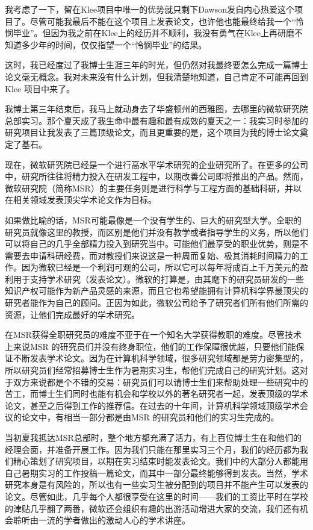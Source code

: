 \documentclass[letter,12pt]{book}
\begin{document}
\begin{CJK}{UTF8}{gbsn}
我考虑了一下，留在Klee项目中唯一的优势就只剩下Dawson发自内心热爱这个项目了。尽管可能我最后不能在这个项目上发表论文，也许他也能最终给我一个“怜悯毕业”。但因为我之前在Klee上的经历并不顺利，我没有勇气在Klee上再研磨不知道多少年的时间，仅仅指望一个“怜悯毕业”的结果。

这时，我已经度过了我博士生涯三年的时光，但仍然对我最终要怎么完成一篇博士论文毫无概念。我对未来没有什么计划，但我清楚地知道，自己肯定不可能再回到Klee 项目中来了。


我博士第三年结束后，我马上就动身去了华盛顿州的西雅图，去哪里的微软研究院总部实习。那个夏天成了我生命中最有趣和最有成效的夏天之一：我实习时参加的研究项目让我发表了三篇顶级论文，而且更重要的是，这个项目为我的博士论文奠定了基石。

现在，微软研究院已经是一个进行高水平学术研究的企业研究所了。在更多的公司中，研究所往往将精力投入在研发工程中，以期改善公司即将推出的产品。然而，微软研究院（简称MSR）的主要任务则是进行科学与工程方面的基础科研，并以在相关领域发表顶尖学术论文作为目标。

如果做比喻的话，MSR可能最像是一个没有学生的、巨大的研究型大学。全职的研究员就像这里的教授，而区别是他们并没有教学或者指导学生的义务，所以他们可以将自己的几乎全部精力投入到研究当中。可能他们最享受的职业优势，则是不需要去申请科研经费，而对教授们来说这是一种周而复始、极其消耗时间精力的工作。因为微软已经是一个利润可观的公司，所以它可以每年将成百上千万美元的盈利用于支持学术研究（发表论文）。微软的打算是，由其麾下的研究员研发的一些知识产权可能作为新产品灵感的来源，而且它也希望能拥有计算机科学界最顶尖的研究者能作为自己的顾问。正因为如此，微软公司给予了研究者们所有他们所需的资源，让他们完成最好的学术研究。

在MSR获得全职研究员的难度不亚于在一个知名大学获得教职的难度。尽管技术上来说MSR 的研究员们并没有终身职位，他们的工作保障很优越，只要他们能保证不断发表学术论文。因为在计算机科学领域，很多研究领域都是劳力密集型的，所以研究员们经常招募博士生作为暑期实习生，帮他们完成自己的研究计划。这对于双方来说都是个不错的交易：研究员们可以请博士生们来帮助处理一些研究中的苦工，而博士生们同时也能有机会和学校以外的著名研究者一起，发表顶级的学术论文，甚至之后得到工作的推荐信。在过去的十年间，计算机科学领域顶级学术会议的论文中，有相当一部分都是由MSR 的研究员和他们的实习生完成的。

当初夏我抵达MSR总部时，整个地方都充满了活力，有上百位博士生在和他们的经理会面，并准备开展工作。因为我们只能在那里实习三个月，我们的经历都为我们精心策划了研究项目，以期在实习结束时能发表论文。我们中的大部分人都能用自己暑期实习的工作投稿一篇论文，而其中一部分最终能够得到发表。当然，学术研究本身是有风险的，所以也有一些实习生被分配到的项目并不能产生可以发表的论文。尽管如此，几乎每个人都很享受在这里的时间——我们的工资比平时在学校的津贴几乎翻了两番，微软还会组织有趣的出游活动增进大家的交流，我们还有机会聆听由一流的学者做出的激动人心的学术讲座。


\end{CJK}
\end{document}
